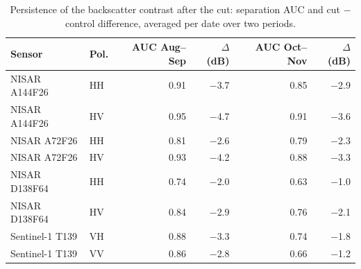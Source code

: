 \begin{table}[htbp]
\centering
\small
\caption{Persistence of the backscatter contrast after the cut: separation AUC and cut $-$ control difference, averaged per date over two periods.}
\label{tab-persistence}
\begin{tabular}{llrrrr}
\toprule
Sensor & Pol. & AUC Aug--Sep & $\Delta$ (dB) & AUC Oct--Nov & $\Delta$ (dB) \\
\midrule
NISAR A144F26 & HH & 0.91 & $-$3.7 & 0.85 & $-$2.9 \\
NISAR A144F26 & HV & 0.95 & $-$4.7 & 0.91 & $-$3.6 \\
NISAR A72F26 & HH & 0.81 & $-$2.6 & 0.79 & $-$2.3 \\
NISAR A72F26 & HV & 0.93 & $-$4.2 & 0.88 & $-$3.3 \\
NISAR D138F64 & HH & 0.74 & $-$2.0 & 0.63 & $-$1.0 \\
NISAR D138F64 & HV & 0.84 & $-$2.9 & 0.76 & $-$2.1 \\
Sentinel-1 T139 & VH & 0.88 & $-$3.3 & 0.74 & $-$1.8 \\
Sentinel-1 T139 & VV & 0.86 & $-$2.8 & 0.66 & $-$1.2 \\
\bottomrule
\end{tabular}
\end{table}
